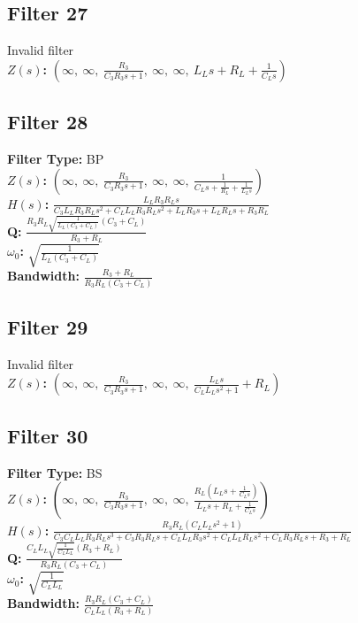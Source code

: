 \documentclass{article}
\begin{document}
\subsection*{Filter 27}
Invalid filter \\ 
\textbf{$Z(s)$:} $\left( \infty, \  \infty, \  \frac{R_{3}}{C_{3} R_{3} s + 1}, \  \infty, \  \infty, \  L_{L} s + R_{L} + \frac{1}{C_{L} s}\right)$ \\ 
\subsection*{Filter 28}
\textbf{Filter Type:} BP \\ 
\textbf{$Z(s)$:} $\left( \infty, \  \infty, \  \frac{R_{3}}{C_{3} R_{3} s + 1}, \  \infty, \  \infty, \  \frac{1}{C_{L} s + \frac{1}{R_{L}} + \frac{1}{L_{L} s}}\right)$ \\ 
\textbf{$H(s)$:} $\frac{L_{L} R_{3} R_{L} s}{C_{3} L_{L} R_{3} R_{L} s^{2} + C_{L} L_{L} R_{3} R_{L} s^{2} + L_{L} R_{3} s + L_{L} R_{L} s + R_{3} R_{L}}$ \\ 
\textbf{Q:} $\frac{R_{3} R_{L} \sqrt{\frac{1}{L_{L} \left(C_{3} + C_{L}\right)}} \left(C_{3} + C_{L}\right)}{R_{3} + R_{L}}$ \\ 
\textbf{$\omega_0$:} $\sqrt{\frac{1}{L_{L} \left(C_{3} + C_{L}\right)}}$ \\ 
\textbf{Bandwidth:} $\frac{R_{3} + R_{L}}{R_{3} R_{L} \left(C_{3} + C_{L}\right)}$ \\ 
\subsection*{Filter 29}
Invalid filter \\ 
\textbf{$Z(s)$:} $\left( \infty, \  \infty, \  \frac{R_{3}}{C_{3} R_{3} s + 1}, \  \infty, \  \infty, \  \frac{L_{L} s}{C_{L} L_{L} s^{2} + 1} + R_{L}\right)$ \\ 
\subsection*{Filter 30}
\textbf{Filter Type:} BS \\ 
\textbf{$Z(s)$:} $\left( \infty, \  \infty, \  \frac{R_{3}}{C_{3} R_{3} s + 1}, \  \infty, \  \infty, \  \frac{R_{L} \left(L_{L} s + \frac{1}{C_{L} s}\right)}{L_{L} s + R_{L} + \frac{1}{C_{L} s}}\right)$ \\ 
\textbf{$H(s)$:} $\frac{R_{3} R_{L} \left(C_{L} L_{L} s^{2} + 1\right)}{C_{3} C_{L} L_{L} R_{3} R_{L} s^{3} + C_{3} R_{3} R_{L} s + C_{L} L_{L} R_{3} s^{2} + C_{L} L_{L} R_{L} s^{2} + C_{L} R_{3} R_{L} s + R_{3} + R_{L}}$ \\ 
\textbf{Q:} $\frac{C_{L} L_{L} \sqrt{\frac{1}{C_{L} L_{L}}} \left(R_{3} + R_{L}\right)}{R_{3} R_{L} \left(C_{3} + C_{L}\right)}$ \\ 
\textbf{$\omega_0$:} $\sqrt{\frac{1}{C_{L} L_{L}}}$ \\ 
\textbf{Bandwidth:} $\frac{R_{3} R_{L} \left(C_{3} + C_{L}\right)}{C_{L} L_{L} \left(R_{3} + R_{L}\right)}$ \\ 
\end{document}
